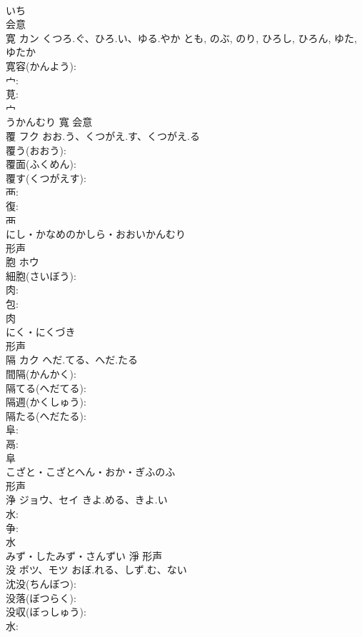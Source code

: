 \documentclass[8pt]{extreport}
\begin{document}
\begin{CJK}{UTF8}{min}
\\	いち	
\\	会意 
\\	寛	カン	くつろ.ぐ、ひろ.い、ゆる.やか	とも, のぶ, のり, ひろし, ひろん, ゆた, ゆたか	
\\	寛容(かんよう): 
\\	宀: 
\\	莧: 
\\	宀	
\\	うかんむり	寬	会意 
\\	覆	フク	おお.う、くつがえ.す、くつがえ.る		
\\	覆う(おおう): 
\\	覆面(ふくめん): 
\\	覆す(くつがえす): 
\\	襾: 
\\	復: 
\\	襾	
\\	にし・かなめのかしら・おおいかんむり	
\\	形声 
\\	胞	ホウ			
\\	細胞(さいぼう): 
\\	肉: 
\\	包: 
\\	肉	
\\	にく・にくづき	
\\	形声 
\\	隔	カク	へだ.てる、へだ.たる		
\\	間隔(かんかく): 
\\	隔てる(へだてる): 
\\	隔週(かくしゅう): 
\\	隔たる(へだたる): 
\\	阜: 
\\	鬲: 
\\	阜	
\\	こざと・こざとへん・おか・ぎふのふ	
\\	形声 
\\	浄	ジョウ、セイ	きよ.める、きよ.い		
\\	水: 
\\	争: 
\\	水	
\\	みず・したみず・さんずい	淨	形声 
\\	没	ボツ、モツ	おぼ.れる、しず.む、ない		
\\	沈没(ちんぼつ): 
\\	没落(ぼつらく): 
\\	没収(ぼっしゅう): 
\\	水: 

\end{CJK}
\end{document}
